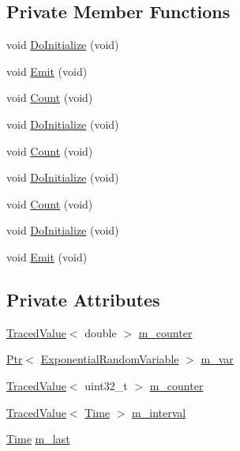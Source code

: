 \subsection*{Private Member Functions}
\begin{DoxyCompactItemize}
\item 
void \hyperlink{classEmitter_ae48c448ed4eac0885e394456a3c8375d}{Do\+Initialize} (void)
\item 
void \hyperlink{classEmitter_aa9071f6918fcf865b6421b229d93267d}{Emit} (void)
\item 
void \hyperlink{classEmitter_a70635630b81636ea8e0d1c22a0ada0dd}{Count} (void)
\item 
void \hyperlink{classEmitter_ae48c448ed4eac0885e394456a3c8375d}{Do\+Initialize} (void)
\item 
void \hyperlink{classEmitter_a70635630b81636ea8e0d1c22a0ada0dd}{Count} (void)
\item 
void \hyperlink{classEmitter_ae48c448ed4eac0885e394456a3c8375d}{Do\+Initialize} (void)
\item 
void \hyperlink{classEmitter_a70635630b81636ea8e0d1c22a0ada0dd}{Count} (void)
\item 
void \hyperlink{classEmitter_ae48c448ed4eac0885e394456a3c8375d}{Do\+Initialize} (void)
\item 
void \hyperlink{classEmitter_aa9071f6918fcf865b6421b229d93267d}{Emit} (void)
\end{DoxyCompactItemize}
\subsection*{Private Attributes}
\begin{DoxyCompactItemize}
\item 
\hyperlink{classns3_1_1TracedValue}{Traced\+Value}$<$ double $>$ \hyperlink{classEmitter_a6bcf8fc80086c7bdea20a23560e9df59}{m\+\_\+counter}
\item 
\hyperlink{classns3_1_1Ptr}{Ptr}$<$ \hyperlink{classns3_1_1ExponentialRandomVariable}{Exponential\+Random\+Variable} $>$ \hyperlink{classEmitter_aeb07b47ae29eeb2a3fd2307546f46593}{m\+\_\+var}
\item 
\hyperlink{classns3_1_1TracedValue}{Traced\+Value}$<$ uint32\+\_\+t $>$ \hyperlink{classEmitter_a4b9687854e7df8b5a4af7b9f020f8361}{m\+\_\+counter}
\item 
\hyperlink{classns3_1_1TracedValue}{Traced\+Value}$<$ \hyperlink{classns3_1_1Time}{Time} $>$ \hyperlink{classEmitter_ad4fd2c5b2816dce9080e20f2e4860ae6}{m\+\_\+interval}
\item 
\hyperlink{classns3_1_1Time}{Time} \hyperlink{classEmitter_a8fe682033b84c0cea6929f0b3a23fef3}{m\+\_\+last}
\end{DoxyCompactItemize}
